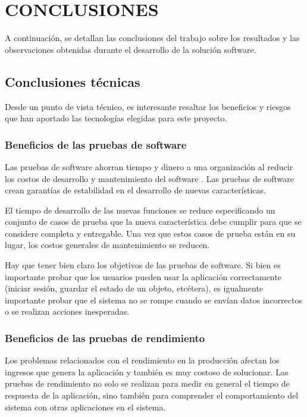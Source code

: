\chapter{CONCLUSIONES\label{sec:conclusiones}}

\clearpage

A continuación, se detallan las conclusiones del trabajo sobre los resultados y las observaciones obtenidas durante el desarrollo de la solución software.

\section{Conclusiones técnicas}

Desde un punto de vista técnico, es interesante resaltar los beneficios y riesgos que han aportado las tecnologías elegidas para este proyecto.

\subsection{Beneficios de las pruebas de software}

Las pruebas de software ahorran tiempo y dinero a una organización al reducir los costos de desarrollo y mantenimiento del software \cite{test1}. Las pruebas de software crean garantías de estabilidad en el desarrollo de nuevas características.

El tiempo de desarrollo de las nuevas funciones se reduce especificando un conjunto de casos de prueba que la nueva característica debe cumplir para que se considere completa y entregable. Una vez que estos casos de prueba están en su lugar, los costos generales de mantenimiento se reducen.

Hay que tener bien claro los objetivos de las pruebas de software. Si bien es importante probar que los usuarios pueden usar la aplicación correctamente (iniciar sesión, guardar el estado de un objeto, etcétera), es igualmente importante probar que el sistema no se rompe cuando se envían datos incorrectos o se realizan acciones inesperadas.

\subsection{Beneficios de las pruebas de rendimiento}

Los problemas relacionados con el rendimiento en la producción afectan los ingresos que genera la aplicación y también es muy costoso de solucionar. Las pruebas de rendimiento no solo se realizan para medir en general el tiempo de respuesta de la aplicación, sino también para comprender el comportamiento del sistema con otras aplicaciones en el sistema.

